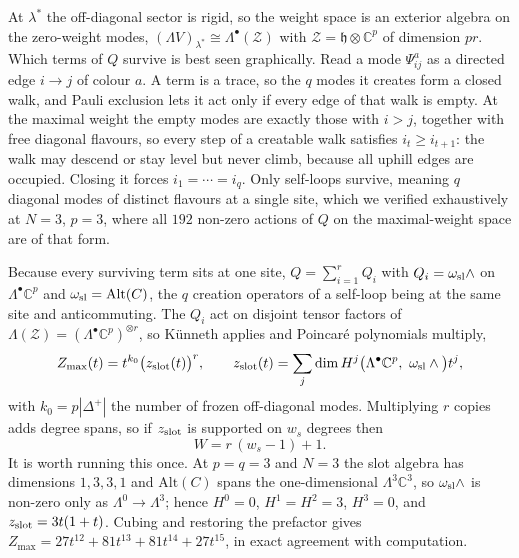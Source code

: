 \documentclass[10pt]{article}
\newcommand{\h}{\mathfrak{h}}
\newcommand{\Alt}{\mathrm{Alt}}
\begin{document}
At $\lambda^*$ the off-diagonal sector is rigid, so the weight space is an exterior algebra on the zero-weight
modes, $(\Lambda V)_{\lambda^*}\cong\Lambda^\bullet(\mathcal Z)$ with $\mathcal Z=\h\otimes\mathbb C^p$ of
dimension $pr$. Which terms of $Q$ survive is best seen graphically. Read a mode $\Psi^a_{ij}$ as a directed
edge $i\to j$ of colour $a$. A term is a trace, so the $q$ modes it creates form a closed walk, and Pauli
exclusion lets it act only if every edge of that walk is empty. At the maximal weight the empty modes are
exactly those with $i>j$, together with free diagonal flavours, so every step of a creatable walk satisfies
$i_t\ge i_{t+1}$: the walk may descend or stay level but never climb, because all uphill edges are occupied.
Closing it forces $i_1=\cdots=i_q$. Only self-loops survive, meaning $q$ diagonal modes of distinct flavours at
a single site, which we verified exhaustively at $N=3$, $p=3$, where all $192$ non-zero actions of $Q$ on the
maximal-weight space are of that form.

Because every surviving term sits at one site, $Q=\sum_{i=1}^rQ_i$ with $Q_i=\omega_{\rm sl}\wedge$ on
$\Lambda^\bullet\mathbb C^p$ and $\omega_{\rm sl}=\Alt(C)$, the $q$ creation operators of a self-loop being at
the same site and anticommuting. The $Q_i$ act on disjoint tensor factors of
$\Lambda(\mathcal Z)=(\Lambda^\bullet\mathbb C^p)^{\otimes r}$, so K\"unneth applies and Poincar\'e polynomials
multiply,
\begin{equation}
Z_{\max}(t)=t^{k_0}\big(z_{\rm slot}(t)\big)^{r},\qquad
z_{\rm slot}(t)=\sum_j\dim H^j\big(\Lambda^\bullet\mathbb C^p,\ \omega_{\rm sl}\wedge\big)t^j,
\label{eq:kunneth}
\end{equation}
with $k_0=p|\Delta^+|$ the number of frozen off-diagonal modes. Multiplying $r$ copies adds degree spans, so if
$z_{\rm slot}$ is supported on $w_s$ degrees then
\begin{equation}
W=r\,(w_s-1)+1 .
\label{eq:ranklaw}
\end{equation}
It is worth running this once. At $p=q=3$ and $N=3$ the slot algebra has dimensions $1,3,3,1$ and $\Alt(C)$
spans the one-dimensional $\Lambda^3\mathbb C^3$, so $\omega_{\rm sl}\wedge$ is non-zero only as
$\Lambda^0\to\Lambda^3$; hence $H^0=0$, $H^1=H^2=3$, $H^3=0$, and $z_{\rm slot}=3t(1+t)$. Cubing and restoring
the prefactor gives $Z_{\max}=27t^{12}+81t^{13}+81t^{14}+27t^{15}$, in exact agreement with computation.
\end{document}
